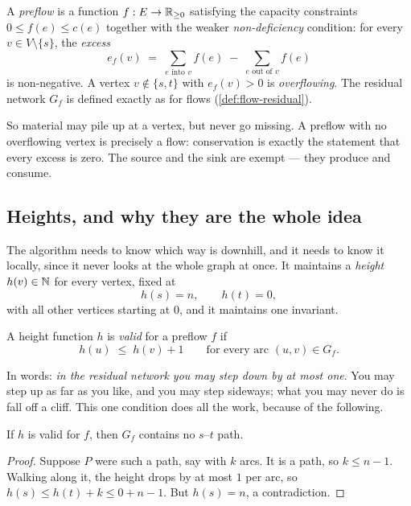 \begin{definition}\label{def:flow-preflow}
A \emph{preflow} is a function $f : E \to \mathbb{R}_{\ge 0}$ satisfying the capacity
constraints $0 \le f(e) \le c(e)$ together with the weaker
\emph{non-deficiency} condition: for every $v \in V \setminus \{s\}$, the
\emph{excess}
\[ e_f(v) \;=\; \sum_{e \text{ into } v} f(e) \;-\; \sum_{e \text{ out of } v} f(e) \]
is non-negative. A vertex $v \notin \{s,t\}$ with $e_f(v) > 0$ is
\emph{overflowing}. The residual network $G_f$ is defined exactly as for flows
(\cref{def:flow-residual}).
\end{definition}

So material may pile up at a vertex, but never go missing. A preflow with no
overflowing vertex is precisely a flow: conservation is exactly the statement
that every excess is zero. The source and the sink are exempt --- they produce
and consume.

\subsection{Heights, and why they are the whole idea}

The algorithm needs to know which way is downhill, and it needs to know it
locally, since it never looks at the whole graph at once. It maintains a
\emph{height} $h(v) \in \mathbb{N}$ for every vertex, fixed at
\[ h(s) = n, \qquad h(t) = 0, \]
with all other vertices starting at $0$, and it maintains one invariant.

\begin{definition}\label{def:flow-height-invariant}
A height function $h$ is \emph{valid} for a preflow $f$ if
\[ h(u) \;\le\; h(v) + 1 \qquad \text{for every arc } (u,v) \in G_f. \]
\end{definition}

In words: \emph{in the residual network you may step down by at most one}. You
may step up as far as you like, and you may step sideways; what you may never
do is fall off a cliff. This one condition does all the work, because of the
following.

\begin{lemma}\label{lem:flow-no-augmenting}
If $h$ is valid for $f$, then $G_f$ contains no $s$--$t$ path.
\end{lemma}

\begin{proof}
Suppose $P$ were such a path, say with $k$ arcs. It is a path, so
$k \le n-1$. Walking along it, the height drops by at most $1$ per arc, so
$h(s) \le h(t) + k \le 0 + n - 1$. But $h(s) = n$, a contradiction.
\end{proof}

